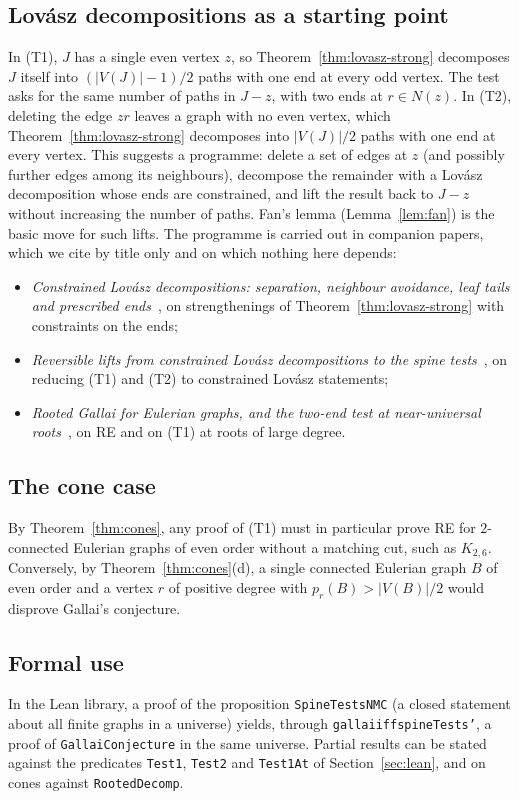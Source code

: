 \documentclass[11pt]{amsart}
\theoremstyle{definition}
\theoremstyle{remark}
\renewcommand{\_}{\oldunderscore\allowbreak}
\newcommand{\pr}{p_r}
\begin{document}
\subsection*{Lov\'asz decompositions as a starting point}
In (T1), $J$ has a single even vertex $z$, so Theorem~\ref{thm:lovasz-strong} decomposes $J$
itself into $(|V(J)|-1)/2$ paths with one end at every odd vertex. The test asks for the same number
of paths in $J-z$, with two ends at $r\in N(z)$. In (T2), deleting the edge $zr$ leaves a graph
with no even vertex, which Theorem~\ref{thm:lovasz-strong} decomposes into $|V(J)|/2$ paths with one
end at every vertex. This suggests a programme: delete a set of edges at $z$ (and possibly further
edges among its neighbours), decompose the remainder with a Lov\'asz decomposition whose ends are
constrained, and lift the result back to $J-z$ without increasing the number of paths. Fan's lemma
(Lemma~\ref{lem:fan}) is the basic move for such lifts. The programme is carried out in companion
papers, which we cite by title only and on which nothing here depends:
\begin{itemize}
\item \emph{Constrained Lov\'asz decompositions: separation, neighbour avoidance, leaf tails and
prescribed ends}~\cite{P2}, on strengthenings of Theorem~\ref{thm:lovasz-strong} with constraints on
the ends;
\item \emph{Reversible lifts from constrained Lov\'asz decompositions to the spine tests}~\cite{P3},
on reducing (T1) and (T2) to constrained Lov\'asz statements;
\item \emph{Rooted Gallai for Eulerian graphs, and the two-end test at near-universal roots}~\cite{P4},
on RE and on (T1) at roots of large degree.
\end{itemize}

\subsection*{The cone case}
By Theorem~\ref{thm:cones}, any proof of (T1) must in particular prove RE for $2$-connected
Eulerian graphs of even order without a matching cut, such as $K_{2,6}$. Conversely, by
Theorem~\ref{thm:cones}(d), a single connected Eulerian graph $B$ of even order and a vertex $r$ of
positive degree with $\pr(B)>|V(B)|/2$ would disprove Gallai's conjecture.

\subsection*{Formal use}
In the Lean library, a proof of the proposition \texttt{SpineTestsNMC} (a closed statement about all
finite graphs in a universe) yields, through \texttt{gallai\_iff\_spineTests'}, a proof of
\texttt{GallaiConjecture} in the same universe. Partial results can be stated against the predicates
\texttt{Test1}, \texttt{Test2} and \texttt{Test1At} of Section~\ref{sec:lean}, and on cones against
\texttt{RootedDecomp}.
\end{document}
